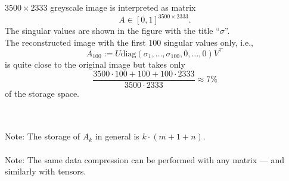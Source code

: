 

\begin{frame}
~\\
\begin{minipage}[c]{0.6\textwidth}
	
\end{minipage}
\begin{minipage}[c]{0.001\textwidth}
	\
\end{minipage}
\begin{minipage}[c]{0.35\textwidth}
	$3500\times2333$ greyscale image is interpreted as matrix $$A\in[0,1]^{3500\times2333}.$$ 
	The singular values are shown in the figure with the title ``$\sigma$''.\\ 
	The reconstructed image with the first 100 singular values only, i.e.,
	$$A_{100}:=U\text{diag}(\sigma_1,\ldots,\sigma_{100},0,\ldots ,0)V^\top$$ 
	is quite close to the original image but takes only
	\[
	\frac{3500\cdot 100+100+100\cdot 2333}{3500\cdot 2333}\approx 7\%
	\]
	of the storage space.
\end{minipage}
~\\~\\
Note: The storage of $A_k$ in general is $k \cdot (m + 1 + n)$.\\~\\
Note: The same data compression can be performed with any matrix --- and similarly with tensors.
\end{frame}

